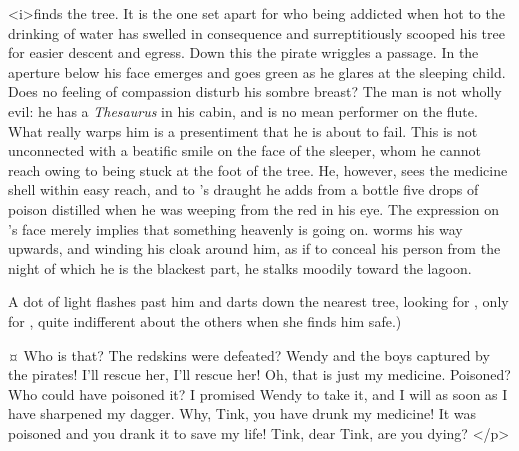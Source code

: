 \begin{drama}
\begin{stagedir}
\hook <i>finds the tree.
It is the one set apart for \slightly who being addicted when hot to the drinking of water has swelled in consequence
and surreptitiously scooped his tree for easier descent and egress.
Down this the pirate wriggles a passage.
In the aperture below his face emerges and goes green as he glares at the sleeping child.
Does no feeling of compassion disturb his sombre breast?
The man is not wholly evil: he has a \emph{Thesaurus} in his cabin, and is no mean performer on the flute.
What really warps him is a presentiment that he is about to fail.
This is not unconnected with a beatific smile on the face of the sleeper,
whom he cannot reach owing to being stuck at the foot of the tree.
He, however, sees the medicine shell within easy reach,
and to \wendy's draught he adds from a bottle five drops of poison
distilled when he was weeping from the red in his eye.
The expression on \peter's face merely implies that something heavenly is going on.
\hook worms his way upwards, and winding his cloak around him,
as if to conceal his person from the night of which he is the blackest part,
he stalks moodily toward the lagoon.

A dot of light flashes past him and darts down the nearest tree, looking for \peter, only for \peter,
quite indifferent about the others when she finds him safe.)
\end{stagedir}

\peterspeaks {}¤
Who is that?
The redskins were defeated?
Wendy and the boys captured by the pirates!
I'll rescue her, I'll rescue her!
Oh, that is just my medicine.
Poisoned?
Who could have poisoned it?
I promised Wendy to take it, and I will as soon as I have sharpened my dagger.
Why, Tink, you have drunk my medicine!
It was poisoned and you drank it to save my life!
Tink, dear Tink, are you dying?
</p>


\end{drama}
